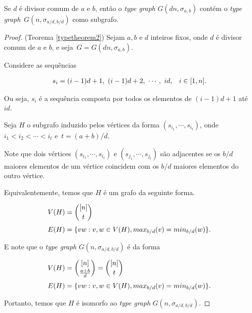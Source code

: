 \begin{teorema}\label{typetheorem2}
Se $d$ é divisor comum de $a$ e $b$, então o \textit{type graph} $G(dn,\sigma_{a,b})$ contém o \textit{type graph}~$G(n,\sigma_{a/d,b/d})$ como subgrafo.
\end{teorema}

\begin{proof}(Teorema \ref{typetheorem2})
Sejam $a,b$ e $d$ inteiros fixos, onde $d$ é divisor comum de $a$ e $b$, e seja~$G = G(dn,\sigma_{a,b})$.

Considere as sequências

\begin{equation*}
\setlength{\jot}{6pt}
\begin{aligned}
s_i &= (i-1)d+1,\ (i-1)d+2,\ \cdots,\ id, & i\in [1,n].
\end{aligned}
\end{equation*}

Ou seja, $s_i$ é a sequência composta por todos os elementos de $(i-1)d+1$ até $id$.

Seja $H$ o subgrafo induzido pelos vértices da forma $(s_{i_1}, \cdots, s_{i_t})$, onde $i_1 < i_2 < \cdots < i_t$ e~$t = (a+b)/d$.

Note que dois vértices $(s_{i_1}, \cdots, s_{i_t})$ e $(s_{j_1}, \cdots, s_{j_t})$ são adjacentes se os $b/d$ maiores elementos de um vértice coincidem com os $b/d$ maiores elementos do outro vértice.


Equivalentemente, temos que $H$ é um grafo da seguinte forma.

\begin{equation*}
\setlength{\jot}{6pt}
\begin{aligned}
V(H) &= \binom{[n]}{t}\\
E(H) &= \{vw : v,w\in V(H), max_{b/d}(v) = min_{b/d}(w)\}.
\end{aligned}
\end{equation*}

E note que o \textit{type graph} $G(n,\sigma_{a/d,b/d})$ é da forma

\begin{equation*}
\setlength{\jot}{6pt}
\begin{aligned}
V(H) &= \binom{[n]}{\frac{a+b}{d}} = \binom{[n]}{t}\\
E(H) &= \{vw : v,w\in V(H), max_{b/d}(v) = min_{b/d}(w)\}.
\end{aligned}
\end{equation*}

Portanto, temos que $H$ é isomorfo ao \textit{type graph} $G(n,\sigma_{a/d,b/d})$.
\end{proof}

